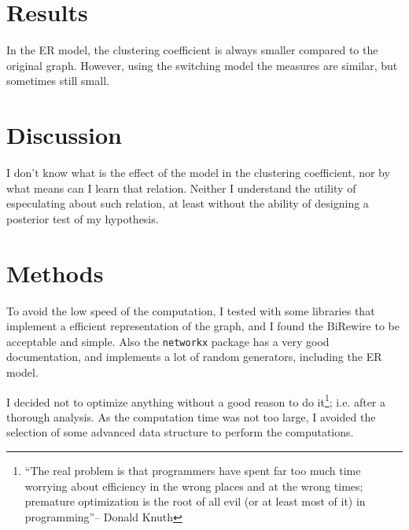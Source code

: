 \documentclass[a4paper]{article}
\begin{document}
\section{Results}

In the ER model, the clustering coefficient is always smaller compared to the 
original graph. However, using the switching model the measures are similar, but 
sometimes still small.

\section{Discussion}

I don't know what is the effect of the model in the clustering coefficient, nor 
by what means can I learn that relation. Neither I understand the utility of 
especulating about such relation, at least without the ability of designing a 
posterior test of my hypothesis.

\section{Methods}

To avoid the low speed of the computation, I tested with some libraries that 
implement a efficient representation of the graph, and I found the BiRewire to 
be acceptable and simple. Also the \texttt{networkx} package has a very good 
documentation, and implements a lot of random generators, including the ER 
model.

I decided not to optimize anything without a good reason to do it\footnote{``The 
real problem is that programmers have spent far too much time worrying about 
efficiency in the wrong places and at the wrong times; premature optimization is 
the root of all evil (or at least most of it) in programming''-- Donald Knuth}; 
i.e.  after a thorough analysis. As the computation time was not too large, I 
avoided the selection of some advanced data structure to perform the 
computations.



\end{document}
